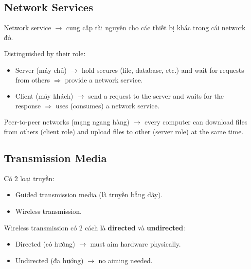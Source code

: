 \subsection{Network Services}

Network service $\rightarrow$ cung cấp tài nguyên cho các thiết bị khác trong cái network đó.
\medskip

\noindent
Distinguished by their role:
\begin{itemize}
  \item Server (máy chủ) $\rightarrow$ hold secures (file, database, etc.) and wait for requests from others $\Rightarrow$ provide a network service.
  \item Client (máy khách) $\rightarrow$ send a request to the server and waits for the response $\Rightarrow$ uses (consumes) a network service.
\end{itemize}


\noindent
Peer-to-peer networks (mạng ngang hàng) $\rightarrow$ every computer can download files from others (client role) and upload files to other (server role) at the same time.
\medskip


\subsection{Transmission Media}

\noindent
Có 2 loại truyền:

\begin{itemize}
  \item Guided transmission media (là truyền bằng dây).
  \item Wireless transmission.
\end{itemize}

\noindent
Wireless transmission có 2 cách là \textbf{directed} và \textbf{undirected}:

\begin{itemize}
  \item Directed (có hướng) $\rightarrow$ must aim hardware physically.
  \item Undirected (đa hướng) $\rightarrow$ no aiming needed.
\end{itemize}

